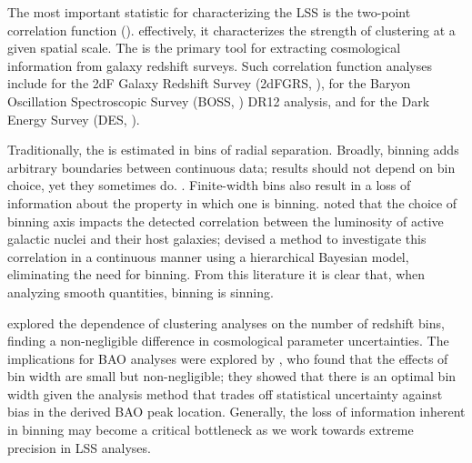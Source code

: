 The most important statistic for characterizing the LSS is the two-point correlation function (\cf).
 effectively, it characterizes the strength of clustering at a given spatial scale.
The \cf is the primary tool for extracting cosmological information from galaxy redshift surveys.
Such correlation function analyses include \cite{Hawkins2003} for the 2dF Galaxy Redshift Survey (2dFGRS, \citealt{Colless2001}), \cite{Alam2017} for the Baryon Oscillation Spectroscopic Survey (BOSS, \citealt{Dawson2013}) DR12 analysis, and \cite{Elvin-Poole2017} for the Dark Energy Survey (DES, \citealt{DES2005}).

Traditionally, the \cf is estimated in bins of radial separation.
Broadly, binning adds arbitrary boundaries between continuous data; results should not depend on bin choice, yet they sometimes do.
.
Finite-width bins also result in a loss of information about the property in which one is binning.
\cite{Lanzuisi2017} noted that the choice of binning axis impacts the detected correlation between the luminosity of active galactic nuclei and their host galaxies; \cite{Grimmett2020} devised a method to investigate this correlation in a continuous manner using a hierarchical Bayesian model, eliminating the need for binning.
From this literature it is clear that, when analyzing smooth quantities, binning is sinning.

\cite{Bailoni2016} explored the dependence of clustering analyses on the number of redshift bins, finding a non-negligible difference in cosmological parameter uncertainties.
The implications for BAO analyses were explored by \cite{Percival2014}, who found that the effects of bin width are small but non-negligible; they showed that there is an optimal bin width given the analysis method that trades off statistical uncertainty against bias in the derived BAO peak location.
Generally, the loss of information inherent in binning may become a critical bottleneck as we work towards extreme precision in LSS analyses.

